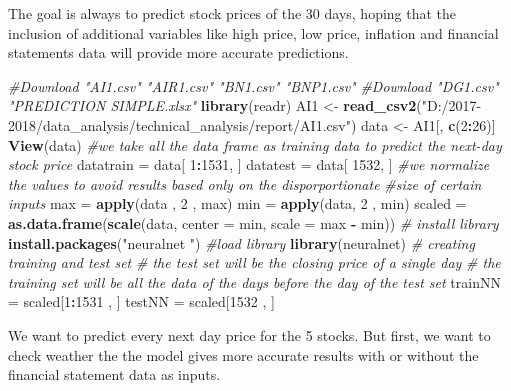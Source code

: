 \documentclass[
  11pt,
]{article}
\newenvironment{Shaded}{\begin{snugshade}}{\end{snugshade}}
\newcommand{\CommentTok}[1]{\textcolor[rgb]{0.56,0.35,0.01}{\textit{#1}}}
\newcommand{\DataTypeTok}[1]{\textcolor[rgb]{0.13,0.29,0.53}{#1}}
\newcommand{\DecValTok}[1]{\textcolor[rgb]{0.00,0.00,0.81}{#1}}
\newcommand{\KeywordTok}[1]{\textcolor[rgb]{0.13,0.29,0.53}{\textbf{#1}}}
\newcommand{\NormalTok}[1]{#1}
\newcommand{\OperatorTok}[1]{\textcolor[rgb]{0.81,0.36,0.00}{\textbf{#1}}}
\newcommand{\StringTok}[1]{\textcolor[rgb]{0.31,0.60,0.02}{#1}}
\begin{document}
The goal is always to predict stock prices of the 30 days, hoping that
the inclusion of additional variables like high price, low price,
inflation and financial statements data will provide more accurate
predictions.

\begin{Shaded}
\begin{Highlighting}[]
\CommentTok{#Download "AI1.csv" "AIR1.csv" "BN1.csv" "BNP1.csv" }
\CommentTok{#Download "DG1.csv" "PREDICTION SIMPLE.xlsx"}
\KeywordTok{library}\NormalTok{(readr)}
\NormalTok{AI1 <-}\StringTok{ }\KeywordTok{read_csv2}\NormalTok{(}\StringTok{"D:/2017-2018/data_analysis/technical_analysis/report/AI1.csv"}\NormalTok{)}
\NormalTok{data <-}\StringTok{ }\NormalTok{AI1[, }\KeywordTok{c}\NormalTok{(}\DecValTok{2}\OperatorTok{:}\DecValTok{26}\NormalTok{)]}
\KeywordTok{View}\NormalTok{(data)}
\CommentTok{#we take all the data frame as training data to predict the next-day stock price}
\NormalTok{datatrain =}\StringTok{ }\NormalTok{data[ }\DecValTok{1}\OperatorTok{:}\DecValTok{1531}\NormalTok{, ]}
\NormalTok{datatest =}\StringTok{ }\NormalTok{data[ }\DecValTok{1532}\NormalTok{, ]}
\CommentTok{#we normalize the values to avoid results based only on the disporportionate}
\CommentTok{#size of certain inputs}
\NormalTok{max =}\StringTok{ }\KeywordTok{apply}\NormalTok{(data , }\DecValTok{2}\NormalTok{ , max)}
\NormalTok{min =}\StringTok{ }\KeywordTok{apply}\NormalTok{(data, }\DecValTok{2}\NormalTok{ , min)}
\NormalTok{scaled =}\StringTok{ }\KeywordTok{as.data.frame}\NormalTok{(}\KeywordTok{scale}\NormalTok{(data, }\DataTypeTok{center =}\NormalTok{ min, }\DataTypeTok{scale =}\NormalTok{ max }\OperatorTok{-}\StringTok{ }\NormalTok{min))}
\CommentTok{# install library}
\KeywordTok{install.packages}\NormalTok{(}\StringTok{"neuralnet "}\NormalTok{)}
\CommentTok{#load library}
\KeywordTok{library}\NormalTok{(neuralnet)}
\CommentTok{# creating training and test set}
\CommentTok{# the test set will be the closing price of a single day}
\CommentTok{# the training set will be all the data of the days before the day of the test set}
\NormalTok{trainNN =}\StringTok{ }\NormalTok{scaled[}\DecValTok{1}\OperatorTok{:}\DecValTok{1531}\NormalTok{ , ]}
\NormalTok{testNN =}\StringTok{ }\NormalTok{scaled[}\DecValTok{1532}\NormalTok{ , ] }
\end{Highlighting}
\end{Shaded}

We want to predict every next day price for the 5 stocks. But first, we
want to check weather the the model gives more accurate results with or
without the financial statement data as inputs.
\end{document}
